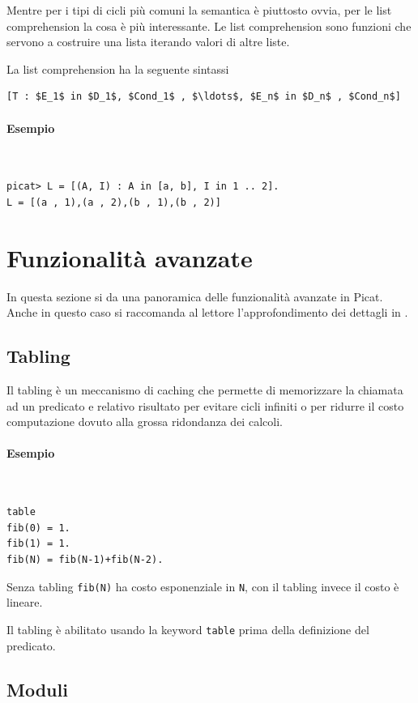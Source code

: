 \documentclass[12pt,a4paper,openright]{book} %
\begin{document}
Mentre per i tipi di cicli più comuni la semantica è piuttosto ovvia, per le list comprehension la cosa è più interessante. Le list comprehension sono funzioni che servono a costruire una lista iterando valori di altre liste.

La list comprehension ha la seguente sintassi
\begin{lstlisting}
[T : $E_1$ in $D_1$, $Cond_1$ , $\ldots$, $E_n$ in $D_n$ , $Cond_n$]
\end{lstlisting}

\paragraph{Esempio}\
\begin{lstlisting}
picat> L = [(A, I) : A in [a, b], I in 1 .. 2].
L = [(a , 1),(a , 2),(b , 1),(b , 2)]
\end{lstlisting}

\section{Funzionalità avanzate}
\label{sec:picat_advanced}

In questa sezione si da una panoramica delle funzionalità avanzate in Picat. Anche in questo caso si raccomanda al lettore l'approfondimento dei dettagli in \cite{PicatGuide}.

\subsection{Tabling}
\label{sec:picat_advanced_tabling}

Il tabling è un meccanismo di caching che permette di memorizzare la chiamata ad un predicato e relativo risultato per evitare cicli infiniti o per ridurre il costo computazione dovuto alla grossa ridondanza dei calcoli.

\paragraph{Esempio}\
\begin{lstlisting}
table
fib(0) = 1.
fib(1) = 1.
fib(N) = fib(N-1)+fib(N-2).
\end{lstlisting}
Senza tabling \verb|fib(N)| ha costo esponenziale in \verb|N|, con il tabling invece il costo è lineare.

Il tabling è abilitato usando la keyword \verb|table| prima della definizione del predicato.

\subsection{Moduli}
\label{sec:picat_advanced_modules}
\end{document}
